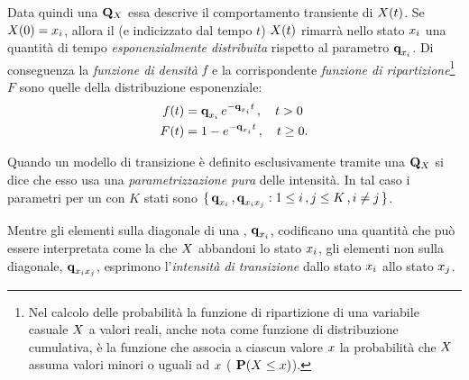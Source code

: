 Data quindi una \im*{} $\mathbf{Q}_{\mathnormal{X}}$ essa descrive il comportamento transiente di $\mathnormal{X}(t)$. Se $\mathnormal{X}(0)=\mathnormal{x}_i$, allora il \mprocess*{} \omog*{} (e indicizzato dal tempo $t$) $\mathnormal{X}(t)$ rimarrà nello stato $\mathnormal{x}_i$ una quantità di tempo \emph{esponenzialmente distribuita} rispetto al parametro $\boldsymbol{\textbf{\text{q}}}_{\mathnormal{x}_i}$. Di conseguenza la \emph{funzione di densità} $f$ e la corrispondente \emph{funzione di ripartizione}\footnote{Nel calcolo delle probabilità la funzione di ripartizione di una variabile casuale $\mathnormal{X}$ a valori reali, anche nota come funzione di distribuzione cumulativa, è la funzione che associa a ciascun valore $\mathnormal{x}$ la probabilità che $\mathnormal{X}$ assuma valori minori o uguali ad $\mathnormal{x}$ (\ie{} $\mathbf{P}(\mathnormal{X} \le \mathnormal{x})$).} $F$ sono quelle della distribuzione esponenziale:
\begin{equation}
\label{eq:im-distrib}
\begin{split}
f(t) &= \boldsymbol{\textbf{\text{q}}}_{\mathnormal{x}_i}\,e^{-\boldsymbol{\textbf{\text{q}}}_{\mathnormal{x}_i}t}\,,\quad t>0 \\
F(t) &= 1-e^{-\boldsymbol{\textbf{\text{q}}}_{\mathnormal{x}_i}t}\,,\quad t\geq0\text{.}
\end{split}
\end{equation}

Quando un modello di transizione è definito esclusivamente tramite una \im*{} $\mathbf{Q}_{\mathnormal{X}}$ si dice che esso usa una \emph{parametrizzazione pura} delle intensità. In tal caso i parametri per un \mprocess*{} \omog*{} con $K$ stati sono $\{\,\boldsymbol{\textbf{\text{q}}}_{\mathnormal{x}_i}\,,\boldsymbol{\textbf{\text{q}}}_{\mathnormal{x}_i\mathnormal{x}_j} : 1 \leq i\,,j \leq K\,,i \neq j\,\}$.

Mentre gli elementi sulla diagonale di una \im*{}, $\boldsymbol{\textbf{\text{q}}}_{\mathnormal{x}_i}$, codificano una quantità che può essere interpretata come la \emph{} che $\mathnormal{X}$ abbandoni lo stato $\mathnormal{x}_i$, gli elementi non sulla diagonale, $\boldsymbol{\textbf{\text{q}}}_{\mathnormal{x}_i\mathnormal{x}_j}$, esprimono l'\emph{intensità di transizione} dallo stato $\mathnormal{x}_i$ allo stato $\mathnormal{x}_j$.

